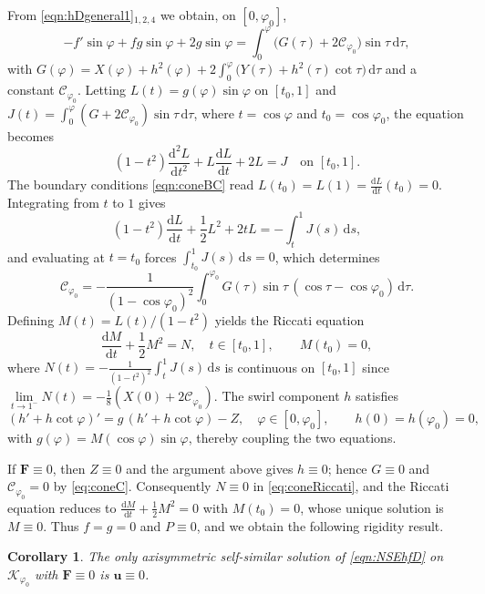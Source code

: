 \documentclass{amsart}
\newtheorem{corollary}{Corollary}[section]
\newcommand{\Bu}{{\boldsymbol{u}}}
\newcommand{\BF}{{\boldsymbol{F}}}
\newcommand{\mcC}{\mathcal{C}}
\newcommand{\rmd}{\mathrm{d}}
\begin{document}
From \eqref{eqn:hDgeneral1}$_{1,2,4}$ we obtain, on $[0,\varphi_0]$,
\[
-f'\sin\varphi + fg\sin\varphi + 2g\sin\varphi
= \int_0^{\varphi} \bigl( G(\tau) + 2\mcC_{\varphi_0} \bigr) \sin\tau \,\rmd\tau,
\]
with $G(\varphi) = X(\varphi) + h^2(\varphi) + 2\int_0^{\varphi} \bigl( Y(\tau) + h^2(\tau)\cot\tau \bigr) \,\rmd\tau$ and a constant $\mcC_{\varphi_0}$.
Letting $L(t)=g(\varphi)\sin\varphi$ on $[t_0,1]$ and $J(t)=\int_0^\varphi (G+2\mcC_{\varphi_0})\sin\tau\,\rmd\tau$, where $t=\cos\varphi$ and $t_0=\cos\varphi_0$, the equation becomes
\[
(1-t^2)\frac{\mathrm{d}^2 L}{\mathrm{d}t^2} + L\frac{\mathrm{d}L}{\mathrm{d}t} + 2L = J \quad\text{on } [t_0,1].
\]
The boundary conditions \eqref{eqn:coneBC} read $L(t_0)=L(1)=\frac{\mathrm{d}L}{\mathrm{d}t}(t_0)=0$.  Integrating from $t$ to $1$ gives
\[
(1-t^2)\frac{\mathrm{d}L}{\mathrm{d}t} + \frac12 L^2 + 2tL = -\int_t^1 J(s)\,\rmd s,
\]
and evaluating at $t=t_0$ forces $\int_{t_0}^1 J(s)\,\rmd s = 0$, which determines
\begin{equation}\label{eq:coneC}
\mcC_{\varphi_0} = -\frac{1}{(1-\cos\varphi_0)^2}\int_0^{\varphi_0} G(\tau)\sin\tau\,(\cos\tau-\cos\varphi_0)\,\rmd\tau .
\end{equation}
Defining $M(t)=L(t)/(1-t^2)$ yields the Riccati equation
\begin{equation}\label{eq:coneRiccati}
\frac{\mathrm{d}M}{\mathrm{d}t} + \frac12 M^{2} = N,\quad t\in[t_0,1],\qquad M(t_0)=0,
\end{equation}
where $N(t)=-\frac{1}{(1-t^2)^2}\int_t^1 J(s)\,\rmd s$ is continuous on $[t_0,1]$ since $\lim\limits_{t\to1^-}N(t)=-\frac18(X(0)+2\mcC_{\varphi_0})$.
The swirl component $h$ satisfies
\begin{equation}\label{eqn:coneSwirlh}
(h'+h\cot\varphi)' = g\,(h'+h\cot\varphi) - Z,\quad \varphi\in[0,\varphi_0],\qquad h(0)=h(\varphi_0)=0,
\end{equation}
with $g(\varphi)=M(\cos\varphi)\sin\varphi$, thereby coupling the two equations.

If $\BF\equiv0$, then $Z\equiv0$ and the argument above gives $h\equiv0$; hence $G\equiv0$ and $\mathcal{C}_{\varphi_0}=0$ by \eqref{eq:coneC}.  Consequently $N\equiv0$ in \eqref{eq:coneRiccati}, and the Riccati equation reduces to $\frac{\mathrm{d}M}{\mathrm{d}t}+\frac12 M^{2}=0$ with $M(t_{0})=0$, whose unique solution is $M\equiv0$.  Thus $f=g=0$ and $P\equiv0$, and we obtain the following rigidity result.

\begin{corollary}
The only axisymmetric self-similar solution of \eqref{eqn:NSEhfD} on $\mathcal{K}_{\varphi_0}$ with $\BF\equiv0$ is $\Bu\equiv0$.
\end{corollary}
\end{document}
